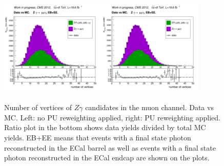 \begin{figure}[htb]
  \begin{center}
   \includegraphics[width=0.45\textwidth]{../figs/figs_v11/MUON_ZGamma/PrepareYields/c_TotalDATAvsMC_EtaCommon__nVtx_noPU.png}\includegraphics[width=0.45\textwidth]{../figs/figs_v11/MUON_ZGamma/PrepareYields/c_TotalDATAvsMC_EtaCommon__nVtx.png}
  \caption{Number of vertices of $Z\gamma$ candidates in the muon channel. Data vs MC. Left: no PU reweighting applied, right: PU reweighting applied. Ratio plot in the bottom shows data yields divided by total MC yields. EB+EE means that events with a final state photon reconstructed in the ECal barrel as well as  events with a final state photon reconstructed in the ECal endcap are shown on the plots.}
  \label{fig:DATAvsMC_nVtx}
  \end{center}
\end{figure}
